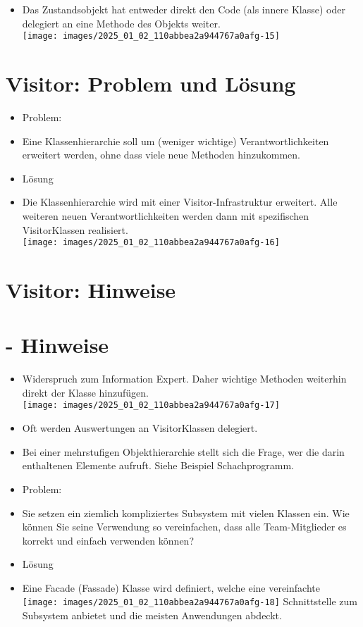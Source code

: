 \documentclass[10pt]{article}
\begin{document}
\begin{itemize}
  \item Das Zustandsobjekt hat entweder direkt den Code (als innere Klasse) oder delegiert an eine Methode des Objekts weiter.\\
\texttt{[image: images/2025\_01\_02\_110abbea2a944767a0afg-15]}
\end{itemize}

\section*{Visitor: Problem und Lösung}
\begin{itemize}
  \item Problem:
  \item Eine Klassenhierarchie soll um (weniger wichtige) Verantwortlichkeiten erweitert werden, ohne dass viele neue Methoden hinzukommen.
  \item Lösung
  \item Die Klassenhierarchie wird mit einer Visitor-Infrastruktur erweitert. Alle weiteren neuen Verantwortlichkeiten werden dann mit spezifischen VisitorKlassen realisiert.\\
\texttt{[image: images/2025\_01\_02\_110abbea2a944767a0afg-16]}
\end{itemize}

\section*{Visitor: Hinweise}
\section*{- Hinweise}
\begin{itemize}
  \item Widerspruch zum Information Expert. Daher wichtige Methoden weiterhin direkt der Klasse hinzufügen.\\
\texttt{[image: images/2025\_01\_02\_110abbea2a944767a0afg-17]}
  \item Oft werden Auswertungen an VisitorKlassen delegiert.
  \item Bei einer mehrstufigen Objekthierarchie stellt sich die Frage, wer die darin enthaltenen Elemente aufruft. Siehe Beispiel Schachprogramm.
  \item Problem:
  \item Sie setzen ein ziemlich kompliziertes Subsystem mit vielen Klassen ein. Wie können Sie seine Verwendung so vereinfachen, dass alle Team-Mitglieder es korrekt und einfach verwenden können?
  \item Lösung
  \item Eine Facade (Fassade) Klasse wird definiert, welche eine vereinfachte\\
\texttt{[image: images/2025\_01\_02\_110abbea2a944767a0afg-18]} Schnittstelle zum Subsystem anbietet und die meisten Anwendungen abdeckt.
\end{itemize}
\end{document}
